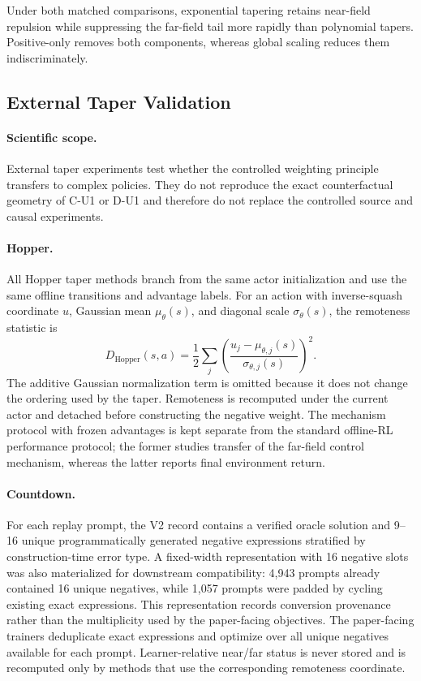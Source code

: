 \documentclass[sigconf,anonymous,review]{acmart}
\theoremstyle{acmdefinition}
\begin{document}
Under both matched comparisons, exponential tapering retains near-field
repulsion while suppressing the far-field tail more rapidly than polynomial
tapers. Positive-only removes both components, whereas global scaling reduces
them indiscriminately.



\subsection{External Taper Validation}
\label{app:external_taper_protocol}

\paragraph{Scientific scope.}
External taper experiments test whether the controlled weighting
principle transfers to complex policies. They do not reproduce the exact
counterfactual geometry of C-U1 or D-U1 and therefore do not replace the
controlled source and causal experiments.

\paragraph{Hopper.}
All Hopper taper methods branch from the same actor initialization and
use the same offline transitions and advantage labels. For an action
with inverse-squash coordinate $u$, Gaussian mean $\mu_\theta(s)$, and
diagonal scale $\sigma_\theta(s)$, the remoteness statistic is
\begin{equation}
    D_{\mathrm{Hopper}}(s,a)
    =
    \frac{1}{2}
    \sum_j
    \left(
        \frac{
            u_j-\mu_{\theta,j}(s)
        }{
            \sigma_{\theta,j}(s)
        }
    \right)^2.
    \label{eq:hopper_taper_remoteness}
\end{equation}
The additive Gaussian normalization term is omitted because it does not
change the ordering used by the taper. Remoteness is recomputed under
the current actor and detached before constructing the negative weight.
The mechanism protocol with frozen advantages is kept separate from the
standard offline-RL performance protocol; the former studies transfer of
the far-field control mechanism, whereas the latter reports final
environment return.

\paragraph{Countdown.}
For each replay prompt, the V2 record contains a verified oracle
solution and 9--16 unique programmatically generated negative
expressions stratified by construction-time error type. A fixed-width
representation with 16 negative slots was also materialized for
downstream compatibility: 4{,}943 prompts already contained 16 unique
negatives, while 1{,}057 prompts were padded by cycling existing exact
expressions. This representation records conversion provenance rather
than the multiplicity used by the paper-facing objectives. The
paper-facing trainers deduplicate exact expressions and optimize over
all unique negatives available for each prompt. Learner-relative
near/far status is never stored and is recomputed only by methods that
use the corresponding remoteness coordinate.
\end{document}
